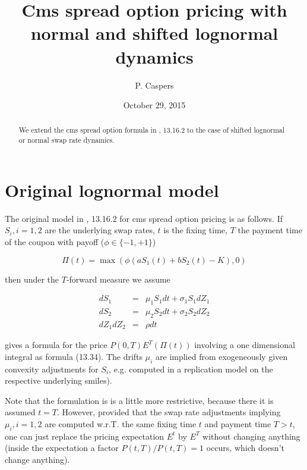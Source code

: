 \documentclass{amsart}
\theoremstyle{plain}
\numberwithin{equation}{section}
\begin{document}
\title[Cms spread option pricing with normal and shifted lognormal dynamics]{Cms spread option pricing with normal and shifted lognormal dynamics}
\author{P. Caspers}
\date{October 29, 2015}
\begin{abstract}
We extend the cms spread option formula in \cite{brigo}, 13.16.2 to the case of shifted lognormal or normal swap rate dynamics.
\end{abstract}

\maketitle

\tableofcontents

\section{Original lognormal model}

The original model in \cite{brigo}, 13.16.2 for cms spread option pricing is as follows. If $S_i, i=1,2$ are the underlying swap rates, $t$ is the fixing time, $T$ the payment time of the coupon with payoff ($\phi\in\{-1,+1\}$)

\begin{equation}
\Pi(t) = \max( \phi (a S_1(t) + b S_2(t) - K), 0 )
\end{equation}

then under the $T$-forward measure we assume

\begin{eqnarray}\label{origmodel}
dS_1 &=& \mu_1 S_1 dt + \sigma_1 S_1 dZ_1 \\
dS_2 &=& \mu_2 S_2 dt + \sigma_2 S_2 dZ_2 \\
dZ_1 dZ_2 &=& \rho dt
\end{eqnarray}

\cite{brigo} gives a formula for the price $P(0,T) E^T ( \Pi(t) )$ involving a one dimensional integral as formula (13.34). The drifts $\mu_i$ are implied from exogeneously given convexity adjustments for $S_i$, e.g. computed in a replication model on the respective underlying smiles).

Note that the formulation is \cite{brigo} is a little more restrictive, because there it is assumed $t=T$. However, provided that the swap rate adjustments implying $\mu_i, i=1,2$ are computed w.r.T. the same fixing time $t$ and payment time $T>t$, one can just replace the pricing expectation $E^t$ by $E^T$ without changing anything (inside the expectation a factor $P(t,T) / P(t,T) = 1$ occurs, which doesn't change anything).
\end{document}
